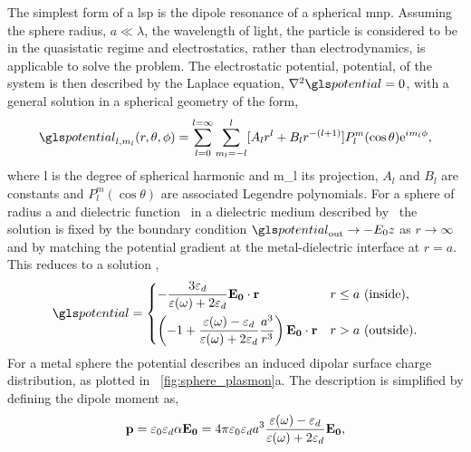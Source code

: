 \documentclass{article}
\begin{document}
The simplest form of a \gls{lsp} is the dipole resonance of a spherical \gls{mnp}. Assuming the sphere radius, $a\ll\lambda$, the wavelength of light, the particle is considered to be in the quasistatic regime and electrostatics, rather than electrodynamics, is applicable to solve the problem. The electrostatic potential, \gls{potential}, of the system is then described by the Laplace equation, $\nabla^2\pot=0$, with a general solution in a spherical geometry of the form,
\begin{equation}
\pot_{l,m_l}(r,\theta,\phi) = \sum_{l=0}^{l=\infty} \sum_{m_l=-l}^l [ A_lr^l + B_lr^{-(l+1)} ] P_l^m (\cos\theta) \e^{i m_l\phi},
\end{equation}
where \gls{l} is the degree of spherical harmonic and \gls{m_l} its projection, $A_l$ and $B_l$ are constants and $P_l^m(\cos\theta)$ are associated Legendre polynomials. For a sphere of radius \gls{a} and dielectric function \dielectric\ in a dielectric medium described by \epsdi\ the solution is fixed by the boundary condition $\pot_{\mathrm{out}}\rightarrow-E_0z$ as $r\rightarrow\infty$ and by matching the potential gradient at the metal-dielectric interface at $r=a$. This reduces to a solution \cite{jackson1999classical},
\begin{equation}
\pot =
\begin{dcases}
-\frac{3\epsdi}{\dielectric + 2\epsdi} \vec{E_0}\cdot\vec{r} & r \leq a\text{ (inside)}, \\
\left(-1 + \frac{\dielectric - \epsdi}{\dielectric + 2\epsdi} \frac{a^3}{r^3}\right) \vec{E_0}\cdot\vec{r} & r > a\text{ (outside)}.
\end{dcases}
\end{equation}
For a metal sphere the potential describes an induced dipolar surface charge distribution, as plotted in \figurename~\ref{fig:sphere_plasmon}a. The description is simplified by defining the dipole moment as,
\begin{equation}
\mathbf{p} = \varepsilon_0\varepsilon_d\alpha\mathbf{E_0} = 4\pi\varepsilon_0\varepsilon_d a^3 \frac{\varepsilon(\omega) - \varepsilon_d}{\varepsilon(\omega) + 2\varepsilon_d} \mathbf{E_0},
\end{equation}
\end{document}
